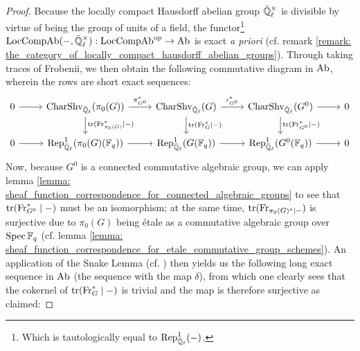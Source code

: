                     \begin{proof}
                        Because the locally compact Hausdorff abelian group $\bar{\Q}_{\ell}^{\x}$ is divisible by virtue of being the group of units of a field, the functor\footnote{Which is tautologically equal to $\mathrm{Rep}^1_{\bar{\mathbb{Q}}_{\ell}}(-)$.} $\Loc\Comp\Ab(-, \bar{\Q}_{\ell}^{\x}): \Loc\Comp\Ab^{\op} \to \Ab$ is exact \textit{a priori} (cf. remark \ref{remark: the_category_of_locally_compact_hausdorff_abelian_groups}). Through taking traces of Frobenii, we then obtain the following commutative diagram in $\mathrm{Ab}$, wherein the rows are short exact sequences:
                            $$
                                \begin{tikzcd}
                                	0 & {\Char\Shv_{\bar{\Q}_{\ell}}(\pi_0(G))} & {\Char\Shv_{\bar{\Q}_{\ell}}(G)} & {\Char\Shv_{\bar{\Q}_{\ell}}(G^0)} & 0 \\
                                	0 & {\Rep^1_{\bar{\Q}_{\ell}}(\pi_0(G)(\F_q))} & {\Rep^1_{\bar{\Q}_{\ell}}(G(\F_q))} & {\Rep^1_{\bar{\Q}_{\ell}}(G^0(\F_q))} & 0
                                	\arrow[from=1-1, to=1-2]
                                	\arrow["{\pi_{G^0}^*}", from=1-2, to=1-3]
                                	\arrow["{\iota_{G^0}^*}", from=1-3, to=1-4]
                                	\arrow[from=1-4, to=1-5]
                                	\arrow[from=2-1, to=2-2]
                                	\arrow[from=2-2, to=2-3]
                                	\arrow[from=2-3, to=2-4]
                                	\arrow[from=2-4, to=2-5]
                                	\arrow["{\trace(\Frob_{\pi_0(G)}^* \mid -)}", from=1-2, to=2-2]
                                	\arrow["{\trace(\Frob_G^* \mid -)}", from=1-3, to=2-3]
                                	\arrow["{\trace(\Frob_{G^0}^* \mid -)}", from=1-4, to=2-4]
                                \end{tikzcd}
                            $$
                        Now, because $G^0$ is a connected commutative algebraic group, we can apply lemma \ref{lemma: sheaf_function_correspondence_for_connected_algebraic_groups} to see that $\operatorname{tr}(\mathrm{Fr}_{G^0}^* \mid -)$ must be an isomorphism; at the same time, $\operatorname{tr}(\mathrm{Fr}_{\pi_0(G)^* \mid -})$ is surjective due to $\pi_0(G)$ being \'etale as a commutative algebraic group over $\operatorname{Spec} \mathbb{F}_q$ (cf. lemma \ref{lemma: sheaf_function_correspondence_for_etale_commutative_group_schemes}). An application of the Snake Lemma (cf. \cite[\href{https://stacks.math.columbia.edu/tag/07JV}{Tag 07JV}]{stacks}) then yields us the following long exact sequence in $\mathrm{Ab}$ (the sequence with the map $\delta$), from which one clearly sees that the cokernel of $\operatorname{tr}(\mathrm{Fr}_G^* \mid -)$ is trivial and the map is therefore surjective as claimed:

\end{proof}
